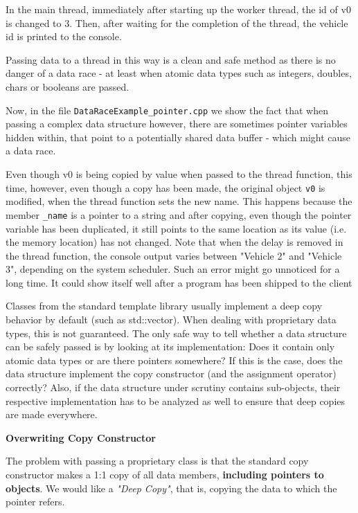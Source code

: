\documentclass[11pt, a4paper]{article}
\begin{document}
In the main thread, immediately after starting up the worker thread, the id of v0 is changed to 3. Then, after waiting for the completion of the thread, the vehicle id is printed to the console.

Passing data to a thread in this way is a clean and safe method as there is no danger of a data race - at least when atomic data types such as integers, doubles, chars or booleans are passed.


Now, in the file \texttt{DataRaceExample\_pointer.cpp} we show the fact that when passing a complex data structure however, there are sometimes pointer variables hidden within, that point to a potentially shared data buffer - which might cause a data race. 


Even though v0 is being copied by value when passed to the thread function, this time, however, even though a copy has been made, the original object \texttt{v0} is modified, when the thread function sets the new name. This happens because the member \texttt{\_name} is a pointer to a string and after copying, even though the pointer variable has been duplicated, it still points to the same location as its value (i.e. the memory location) has not changed. Note that when the delay is removed in the thread function, the console output varies between "Vehicle 2" and "Vehicle 3", depending on the system scheduler. Such an error might go unnoticed for a long time. It could show itself well after a program has been shipped to the client



Classes from the standard template library usually implement a deep copy behavior by default (such as std::vector). When dealing with proprietary data types, this is not guaranteed. The only safe way to tell whether a data structure can be safely passed is by looking at its implementation: Does it contain only atomic data types or are there pointers somewhere? If this is the case, does the data structure implement the copy constructor (and the assignment operator) correctly? Also, if the data structure under scrutiny contains sub-objects, their respective implementation has to be analyzed as well to ensure that deep copies are made everywhere.



\textbf{Overwriting Copy Constructor}

The problem with passing a proprietary class is that the standard copy constructor makes a 1:1 copy of all data members, \textbf{including pointers to objects}. We would like a \textit{"Deep Copy"}, that is, copying the data to which the pointer refers. 
\end{document}
